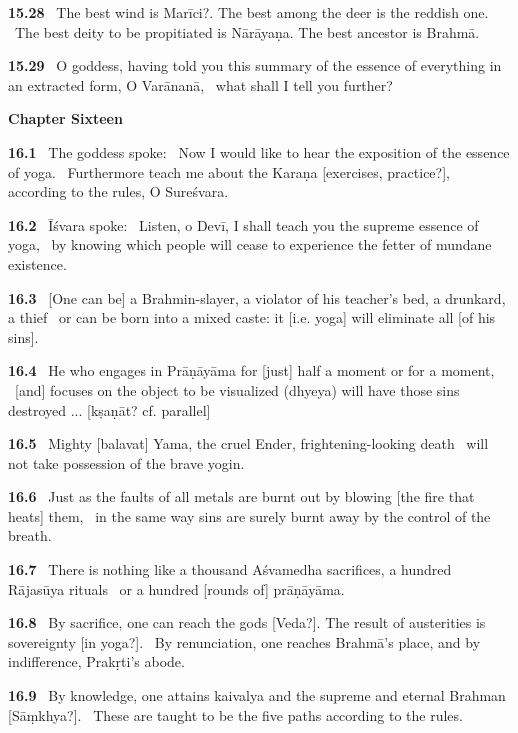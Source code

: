 \documentclass{article}
\begin{document}
\textbf{15.28}%
\ The best wind is Marīci?.  The best among the deer is the reddish one.%
\         The best deity to be propitiated is Nārāyaṇa. The best ancestor is Brahmā.%


\textbf{15.29}%
\ O goddess, having told you this summary of the essence of everything in an extracted form, O Varānanā,%
\                         what shall I tell you further?%
\vfill\pagebreak\begin{center}{\large\textbf{ Chapter Sixteen 
}}\end{center}


\textbf{16.1}%
\ The goddess spoke:%
\ Now I would like to hear the exposition of the essence of yoga.%
\ Furthermore teach me about the Karaṇa [exercises, practice?], according to the rules, O Sureśvara.%


\textbf{16.2}%
\ Īśvara spoke:%
\ Listen, o Devī, I shall teach you the supreme essence of yoga,%
\ by knowing which people will cease to experience the fetter of mundane existence.%


\textbf{16.3}%
\ [One can be] a Brahmin-slayer, a violator of his teacher's bed, a drunkard, a thief%
\ or can be born into a mixed caste: it [i.e. yoga] will eliminate all [of his sins].%


\textbf{16.4}%
\ He who engages in Prāṇāyāma for [just] half a moment or for a moment,%
\ [and] focuses on the object to be visualized (dhyeya) will have those sins destroyed ... [kṣaṇāt? cf. parallel]%


\textbf{16.5}%
\ Mighty [balavat] Yama, the cruel Ender, frightening-looking death%
\ will not take possession of the brave yogin.%


\textbf{16.6}%
\ Just as the faults of all metals are burnt out by blowing [the fire that heats] them,%
\ in the same way sins are surely burnt away by the control of the breath.%


\textbf{16.7}%
\ There is nothing like a thousand Aśvamedha sacrifices, a hundred Rājasūya rituals%
\ or a hundred [rounds of] prāṇāyāma.%


\textbf{16.8}%
\ By sacrifice, one can reach the gods [Veda?]. The result of austerities is sovereignty [in yoga?].%
\                  By renunciation, one reaches Brahmā's place, and by indifference, Prakṛti's abode.%


\textbf{16.9}%
\ By knowledge, one attains kaivalya and the supreme and eternal Brahman [Sāṃkhya?].%
\                  These are taught to be the five paths according to the rules.%
\end{document}
